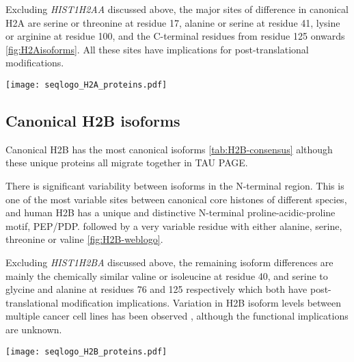     Excluding \textit{HIST1H2AA} discussed above,
    the major sites of difference in canonical H2A are
    serine or threonine at residue 17,
    alanine or serine at residue 41,
    lysine or arginine at residue 100,
    and the C-terminal residues from residue 125 onwards \ref{fig:H2Aisoforms}.
    All these sites have implications for post-translational modifications.

    \begin{TableAndFigure*}
      \label{tab:H2A-consensus}
      
      \label{fig:H2A-weblogo}
      \texttt{[image: seqlogo\_H2A\_proteins.pdf]}
    \end{TableAndFigure*}

  \subsection{Canonical H2B isoforms}
    Canonical H2B has the most canonical isoforms \ref{tab:H2B-consensus}
    although these \HTwoBUniqueProteins{} unique proteins all migrate together in TAU PAGE.

    There is significant variability between isoforms in the N-terminal region.
    This is one of the most variable sites between canonical core histones of different species, and
    human H2B has a unique and distinctive N-terminal proline-acidic-proline motif, PEP/PDP.
    followed by a very variable residue with either alanine, serine, threonine or valine \ref{fig:H2B-weblogo}.

    Excluding \textit{HIST1H2BA} discussed above,
    the remaining isoform differences are mainly the chemically similar valine or isoleucine at residue 40,
    and serine to glycine and alanine at residues 76 and 125 respectively
    which both have post-translational modification implications.
    Variation in H2B isoform levels between multiple cancer cell lines has been observed \citep{Molden2015},
    although the functional implications are unknown.

    \begin{TableAndFigure*}
      \label{tab:H2B-consensus}
      
      \label{fig:H2B-weblogo}
      \texttt{[image: seqlogo\_H2B\_proteins.pdf]}
    \end{TableAndFigure*}

